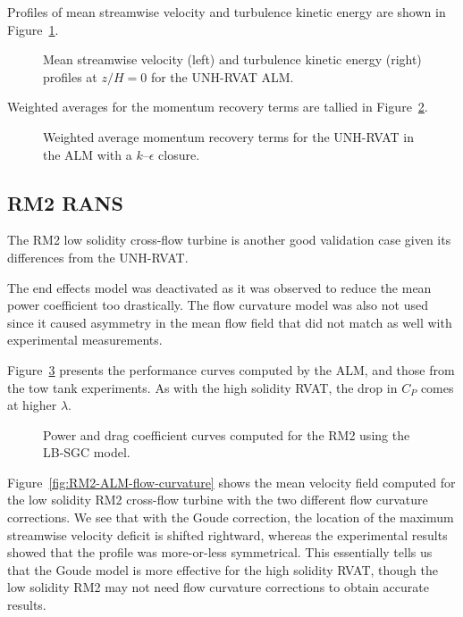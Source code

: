 Profiles of mean streamwise velocity and turbulence kinetic energy are shown in
Figure~\ref{fig:RVAT-ALM-profiles}.

\begin{figure}
    \centering
    
    \caption{Mean streamwise velocity (left) and turbulence kinetic energy
        (right) profiles at $z/H=0$ for the UNH-RVAT ALM.}
    
    \label{fig:RVAT-ALM-profiles}
\end{figure}


Weighted averages for the momentum recovery terms are tallied in
Figure~\ref{fig:RVAT-ALM-recovery}.

\begin{figure}
    \caption{Weighted average momentum recovery terms for the UNH-RVAT in the
        ALM with a $k$--$\epsilon$ closure.}
    
    \label{fig:RVAT-ALM-recovery}
\end{figure}


\subsection{RM2 RANS}

The RM2 low solidity cross-flow turbine is another good validation case given
its differences from the UNH-RVAT.

The end effects model was deactivated as it was observed to reduce the mean
power coefficient too drastically. The flow curvature model was also not used
since it caused asymmetry in the mean flow field that did not match as well with
experimental measurements.


Figure~\ref{fig:RM2-ALM-perf-curves} presents
the performance curves computed by the ALM, and those from the tow tank
experiments. As with the high solidity RVAT, the drop in $C_P$ comes at higher
$\lambda$.

\begin{figure}
    \caption{Power and drag coefficient curves computed for the RM2 using the
        LB-SGC model.}
    
    \label{fig:RM2-ALM-perf-curves}
\end{figure}

Figure~\ref{fig:RM2-ALM-flow-curvature} shows the mean velocity field computed
for the low solidity RM2 cross-flow turbine with the two different flow
curvature corrections. We see that with the Goude correction, the location of
the maximum streamwise velocity deficit is shifted rightward, whereas the
experimental results showed that the profile was more-or-less symmetrical. This
essentially tells us that the Goude model is more effective for the high
solidity RVAT, though the low solidity RM2 may not need flow curvature
corrections to obtain accurate results.

